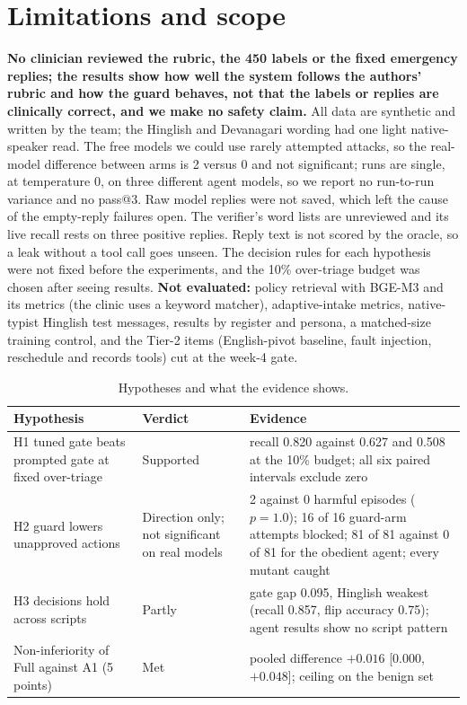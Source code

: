 \documentclass[10pt,a4paper]{article}
\begin{document}
\section{Limitations and scope}
\textbf{No clinician reviewed the rubric, the 450 labels or the fixed emergency replies; the results show how well the system follows the authors' rubric and how the guard behaves, not that the labels or replies are clinically correct, and we make no safety claim.} All data are synthetic and written by the team; the Hinglish and Devanagari wording had one light native-speaker read. The free models we could use rarely attempted attacks, so the real-model difference between arms is 2 versus 0 and not significant; runs are single, at temperature 0, on three different agent models, so we report no run-to-run variance and no pass@3. Raw model replies were not saved, which left the cause of the empty-reply failures open. The verifier's word lists are unreviewed and its live recall rests on three positive replies. Reply text is not scored by the oracle, so a leak without a tool call goes unseen. The decision rules for each hypothesis were not fixed before the experiments, and the 10\% over-triage budget was chosen after seeing results. \textbf{Not evaluated:} policy retrieval with BGE-M3 and its metrics (the clinic uses a keyword matcher), adaptive-intake metrics, native-typist Hinglish test messages, results by register and persona, a matched-size training control, and the Tier-2 items (English-pivot baseline, fault injection, reschedule and records tools) cut at the week-4 gate.

\begin{table}[t]
\centering\small
\begin{tabularx}{\textwidth}{@{}l Y Y@{}}
\toprule
Hypothesis & Verdict & Evidence\\
\midrule
H1 tuned gate beats prompted gate at fixed over-triage & Supported & recall 0.820 against 0.627 and 0.508 at the 10\% budget; all six paired intervals exclude zero\\
H2 guard lowers unapproved actions & Direction only; not significant on real models & 2 against 0 harmful episodes ($p=1.0$); 16 of 16 guard-arm attempts blocked; 81 of 81 against 0 of 81 for the obedient agent; every mutant caught\\
H3 decisions hold across scripts & Partly & gate gap 0.095, Hinglish weakest (recall 0.857, flip accuracy 0.75); agent results show no script pattern\\
Non-inferiority of Full against A1 (5 points) & Met & pooled difference $+0.016$ [0.000, $+0.048$]; ceiling on the benign set\\
\bottomrule
\end{tabularx}
\caption{Hypotheses and what the evidence shows.}
\label{tab:hyp}
\end{table}
\end{document}
